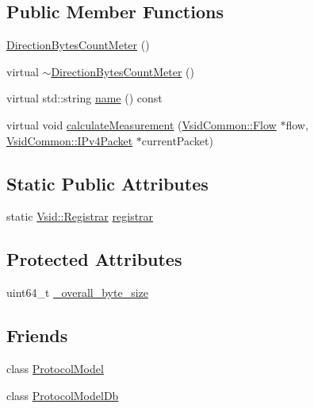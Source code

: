 \subsection*{Public Member Functions}
\begin{DoxyCompactItemize}
\item 
\hyperlink{class_vsid_1_1_direction_bytes_count_meter_a1de58a9f84f5e72cb2c1d3aa40a87984}{Direction\-Bytes\-Count\-Meter} ()
\item 
virtual \hyperlink{class_vsid_1_1_direction_bytes_count_meter_a37f2bf1100ceaebd544f392983f3a629}{$\sim$\-Direction\-Bytes\-Count\-Meter} ()
\item 
virtual std\-::string \hyperlink{class_vsid_1_1_direction_bytes_count_meter_aa6dbbee305932631395d596f8c68c7f9}{name} () const 
\item 
virtual void \hyperlink{class_vsid_1_1_direction_bytes_count_meter_a4768e6b91e25682668f49ed2f59b1bf5}{calculate\-Measurement} (\hyperlink{class_vsid_common_1_1_flow}{Vsid\-Common\-::\-Flow} $\ast$flow, \hyperlink{class_vsid_common_1_1_i_pv4_packet}{Vsid\-Common\-::\-I\-Pv4\-Packet} $\ast$current\-Packet)
\end{DoxyCompactItemize}
\subsection*{Static Public Attributes}
\begin{DoxyCompactItemize}
\item 
static \hyperlink{class_vsid_1_1_registrar}{Vsid\-::\-Registrar} \hyperlink{class_vsid_1_1_direction_bytes_count_meter_a15ee270ef7ea1977a3a2e246d6adecdd}{registrar}
\end{DoxyCompactItemize}
\subsection*{Protected Attributes}
\begin{DoxyCompactItemize}
\item 
uint64\-\_\-t \hyperlink{class_vsid_1_1_direction_bytes_count_meter_aabfb4d08acf97bcc1ac0f97b01fd9685}{\-\_\-overall\-\_\-byte\-\_\-size}
\end{DoxyCompactItemize}
\subsection*{Friends}
\begin{DoxyCompactItemize}
\item 
class \hyperlink{class_vsid_1_1_direction_bytes_count_meter_a80219b863d4ff3456933d16bc5f73f45}{Protocol\-Model}
\item 
class \hyperlink{class_vsid_1_1_direction_bytes_count_meter_a3c0d389e7a9476b06313d8fb9ca9fe68}{Protocol\-Model\-Db}
\end{DoxyCompactItemize}


